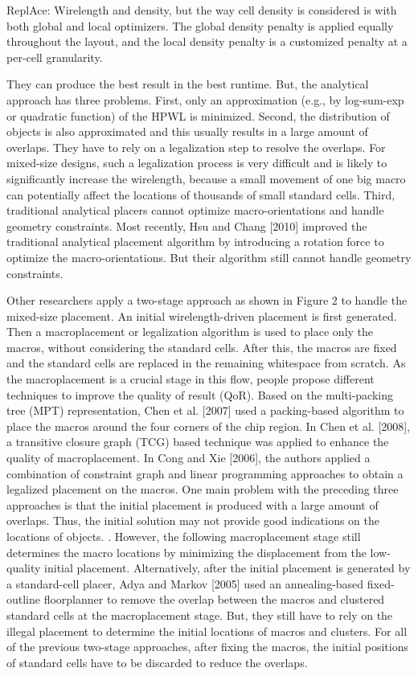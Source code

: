 ReplAce:
Wirelength and density, but the way cell density is considered is with both global and local optimizers. The global density
penalty is applied equally throughout the layout, and the local density penalty is a customized penalty at a per-cell granularity. 


They can produce the best result in the best runtime. But, the analytical approach has three problems. First, only an approximation (e.g., by log-sum-exp or quadratic function) of the HPWL is minimized. Second, the distribution of objects is also approximated and this usually results in a large amount of overlaps. They have to rely on a legalization step to resolve the overlaps. For mixed-size designs, such a legalization process is very difficult and is likely to significantly increase the wirelength, because a small movement of one big macro can potentially affect the locations of thousands of small standard cells. Third, traditional analytical placers cannot optimize macro-orientations and handle geometry constraints. Most recently, Hsu and Chang [2010] improved the traditional analytical placement algorithm by introducing a rotation force to optimize the macro-orientations. But their algorithm still cannot handle geometry constraints.

Other researchers apply a two-stage approach as shown in Figure 2 to handle the mixed-size placement. An initial wirelength-driven placement is first generated. Then a macroplacement or legalization algorithm is used to place only the macros, without considering the standard cells. After this, the macros are fixed and the standard cells are replaced in the remaining whitespace from scratch. As the macroplacement is a crucial stage in this flow, people propose different techniques to improve the quality of result (QoR). Based on the multi-packing tree (MPT) representation, Chen et al. [2007] used a packing-based algorithm to place the macros around the four corners of the chip region. In Chen et al. [2008], a transitive closure graph (TCG) based technique was applied to enhance the quality of macroplacement. In Cong and Xie [2006], the authors applied a combination of constraint graph and linear programming approaches to obtain a legalized placement on the macros. One main problem with the preceding three approaches is that the initial placement is produced with a large amount of overlaps. Thus, the initial solution may not provide good indications on the locations of objects. . However, the following macroplacement stage still determines the macro locations by minimizing the displacement from the low-quality initial placement.
Alternatively, after the initial placement is generated by a standard-cell placer, Adya and Markov [2005] used an annealing-based fixed-outline floorplanner to remove the overlap between the macros and clustered standard cells at the macroplacement stage. But, they still have to rely on the illegal placement to determine the initial locations of macros and clusters. For all of the previous two-stage approaches, after fixing the macros, the initial positions of standard cells have to be discarded to reduce the overlaps.



